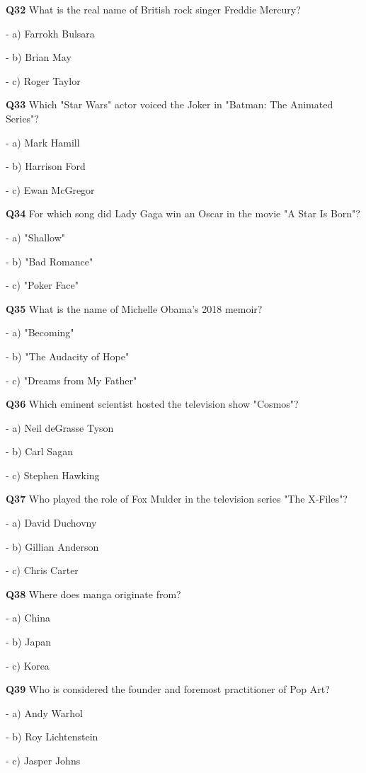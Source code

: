 \textbf{Q32} What is the real name of British rock singer Freddie Mercury?\par
\quad - a) Farrokh Bulsara\par
\quad - b) Brian May\par
\quad - c) Roger Taylor\par

\textbf{Q33} Which "Star Wars" actor voiced the Joker in "Batman: The Animated Series"?\par
\quad - a) Mark Hamill\par
\quad - b) Harrison Ford\par
\quad - c) Ewan McGregor\par

\textbf{Q34} For which song did Lady Gaga win an Oscar in the movie "A Star Is Born"?\par
\quad - a) "Shallow"\par
\quad - b) "Bad Romance"\par
\quad - c) "Poker Face"\par

\textbf{Q35} What is the name of Michelle Obama's 2018 memoir?\par
\quad - a) "Becoming"\par
\quad - b) "The Audacity of Hope"\par
\quad - c) "Dreams from My Father"\par

\textbf{Q36} Which eminent scientist hosted the television show "Cosmos"?\par
\quad - a) Neil deGrasse Tyson\par
\quad - b) Carl Sagan\par
\quad - c) Stephen Hawking\par

\textbf{Q37} Who played the role of Fox Mulder in the television series "The X‑Files"?\par
\quad - a) David Duchovny\par
\quad - b) Gillian Anderson\par
\quad - c) Chris Carter\par

\textbf{Q38} Where does manga originate from?\par
\quad - a) China\par
\quad - b) Japan\par
\quad - c) Korea\par

\textbf{Q39} Who is considered the founder and foremost practitioner of Pop Art?\par
\quad - a) Andy Warhol\par
\quad - b) Roy Lichtenstein\par
\quad - c) Jasper Johns\par

